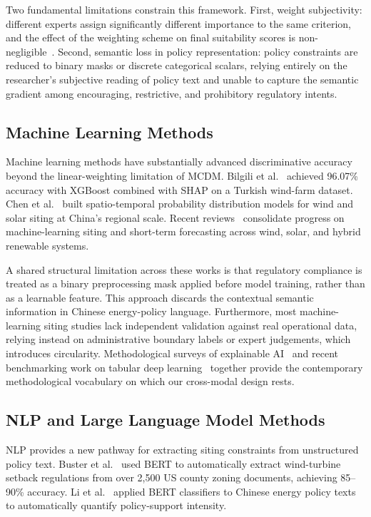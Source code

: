 \documentclass[12pt, a4paper]{article}
\begin{document}
Two fundamental limitations constrain this framework. First,
weight subjectivity: different experts assign significantly
different importance to the same criterion, and the effect of
the weighting scheme on final suitability scores is
non-negligible~\cite{wu2022,xu2020}. Second, semantic loss in
policy representation: policy constraints are reduced to binary
masks or discrete categorical scalars, relying entirely on the
researcher's subjective reading of policy text and unable to
capture the semantic gradient among encouraging, restrictive,
and prohibitory regulatory intents.

\subsection{Machine Learning Methods}

Machine learning methods have substantially advanced
discriminative accuracy beyond the linear-weighting limitation
of MCDM. Bilgili et al.~\cite{bilgili2024} achieved 96.07\%
accuracy with XGBoost combined with SHAP on a Turkish wind-farm
dataset. Chen et al.~\cite{chen2026} built spatio-temporal
probability distribution models for wind and solar siting at
China's regional scale. Recent reviews~\cite{jurasz2025}
consolidate progress on machine-learning siting and
short-term forecasting across wind, solar, and hybrid
renewable systems.

A shared structural limitation across these works is that
regulatory compliance is treated as a binary preprocessing
mask applied before model training, rather than as a learnable
feature. This approach discards the contextual semantic
information in Chinese energy-policy language. Furthermore,
most machine-learning siting studies lack independent
validation against real operational data, relying instead on
administrative boundary labels or expert judgements, which
introduces circularity. Methodological surveys of explainable
AI~\cite{samek2021} and recent benchmarking work on tabular
deep learning~\cite{shwartz2022,borisov2022} together provide
the contemporary methodological vocabulary on which our
cross-modal design rests.

\subsection{NLP and Large Language Model Methods}

NLP provides a new pathway for extracting siting constraints
from unstructured policy text. Buster et al.~\cite{buster2024}
used BERT to automatically extract wind-turbine setback
regulations from over 2,500 US county zoning documents,
achieving 85--90\% accuracy. Li et al.~\cite{li2023} applied
BERT classifiers to Chinese energy policy texts to
automatically quantify policy-support intensity.
\end{document}
